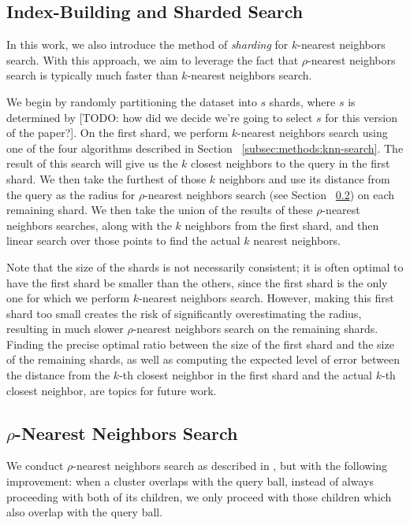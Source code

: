 \subsection {Index-Building and Sharded Search}
In this work, we also introduce the method of \emph{sharding} for $k$-nearest neighbors search.
With this approach, we aim to leverage the fact that $\rho$-nearest neighbors search is typically 
much faster than $k$-nearest neighbors search. 


We begin by randomly partitioning the dataset into $s$ shards, where $s$ is determined by [TODO: how did 
we decide we're going to select $s$ for this version of the paper?]. On the first shard, we perform 
$k$-nearest neighbors search using one of the four algorithms described in Section ~\ref{subsec:methods:knn-search}.
The result of this search will give us the $k$ closest neighbors to the query in the first shard. We then take the furthest of 
those $k$ neighbors and use its distance from the query as the radius for $\rho$-nearest neighbors search (see Section ~\ref{subsec:methods:rnn-search}) 
on each remaining shard. We then take the union of the results of these $\rho$-nearest neighbors searches, along with the $k$ neighbors
from the first shard, and then linear search over those points to find the actual $k$ nearest neighbors.


Note that the size of the shards is not necessarily consistent; it is often optimal to have the first shard be smaller than the others,
since the first shard is the only one for which we perform $k$-nearest neighbors search. However, making this first shard too small
creates the risk of significantly overestimating the radius, resulting in much slower $\rho$-nearest neighbors search on the remaining shards.
Finding the precise optimal ratio between the size of the first shard and the size of the remaining shards, as well 
as computing the expected level of error between the distance from the $k$-th closest neighbor in the first shard and the 
actual $k$-th closest neighbor, are topics for future work.

\subsection{\texorpdfstring{$\rho$}{p}-Nearest Neighbors Search}
\label{subsec:methods:rnn-search}

We conduct $\rho$-nearest neighbors search as described in \cite{ishaq2019clustered}, but 
with the following improvement: when a cluster overlaps with the query ball, instead of  
always proceeding with both of its children, we only proceed with those children which 
also overlap with the query ball. 

